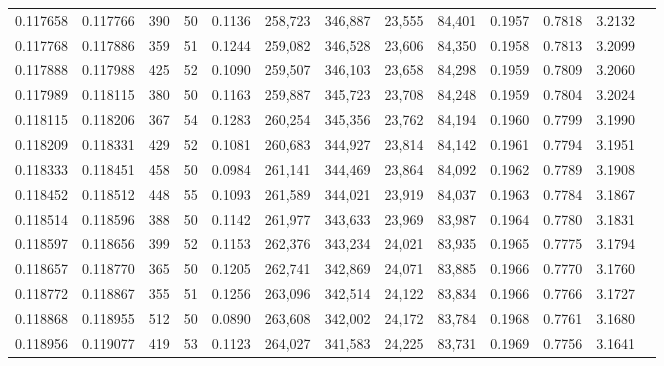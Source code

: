 \begin{tabular}{rrrrrrrrrrrrr}
0.117658 & 0.117766 &   390 &  50 &                                     0.1136 & 258,723 & 346,887 &  23,555 &  84,401 & 0.1957 & 0.7818 & 3.2132 \\
0.117768 & 0.117886 &   359 &  51 &                                     0.1244 & 259,082 & 346,528 &  23,606 &  84,350 & 0.1958 & 0.7813 & 3.2099 \\
0.117888 & 0.117988 &   425 &  52 &                                     0.1090 & 259,507 & 346,103 &  23,658 &  84,298 & 0.1959 & 0.7809 & 3.2060 \\
0.117989 & 0.118115 &   380 &  50 &                                     0.1163 & 259,887 & 345,723 &  23,708 &  84,248 & 0.1959 & 0.7804 & 3.2024 \\
0.118115 & 0.118206 &   367 &  54 &                                     0.1283 & 260,254 & 345,356 &  23,762 &  84,194 & 0.1960 & 0.7799 & 3.1990 \\
0.118209 & 0.118331 &   429 &  52 &                                     0.1081 & 260,683 & 344,927 &  23,814 &  84,142 & 0.1961 & 0.7794 & 3.1951 \\
0.118333 & 0.118451 &   458 &  50 &                                     0.0984 & 261,141 & 344,469 &  23,864 &  84,092 & 0.1962 & 0.7789 & 3.1908 \\
0.118452 & 0.118512 &   448 &  55 &                                     0.1093 & 261,589 & 344,021 &  23,919 &  84,037 & 0.1963 & 0.7784 & 3.1867 \\
0.118514 & 0.118596 &   388 &  50 &                                     0.1142 & 261,977 & 343,633 &  23,969 &  83,987 & 0.1964 & 0.7780 & 3.1831 \\
0.118597 & 0.118656 &   399 &  52 &                                     0.1153 & 262,376 & 343,234 &  24,021 &  83,935 & 0.1965 & 0.7775 & 3.1794 \\
0.118657 & 0.118770 &   365 &  50 &                                     0.1205 & 262,741 & 342,869 &  24,071 &  83,885 & 0.1966 & 0.7770 & 3.1760 \\
0.118772 & 0.118867 &   355 &  51 &                                     0.1256 & 263,096 & 342,514 &  24,122 &  83,834 & 0.1966 & 0.7766 & 3.1727 \\
0.118868 & 0.118955 &   512 &  50 &                                     0.0890 & 263,608 & 342,002 &  24,172 &  83,784 & 0.1968 & 0.7761 & 3.1680 \\
0.118956 & 0.119077 &   419 &  53 &                                     0.1123 & 264,027 & 341,583 &  24,225 &  83,731 & 0.1969 & 0.7756 & 3.1641 \\

\end{tabular}
